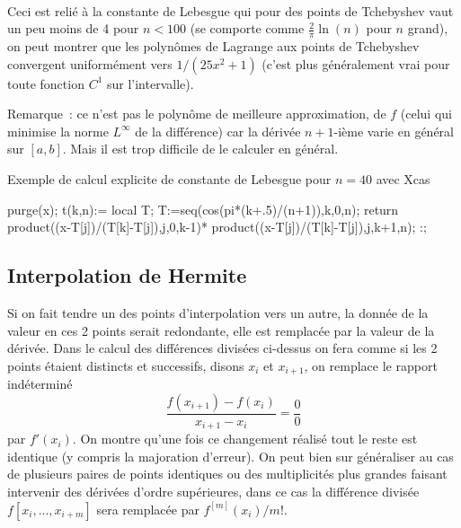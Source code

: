 \documentclass[a4paper,11pt]{article}
\begin{document}
\begin{giacjshere}
\\

Ceci est reli\'e \`a la constante de Lebesgue 
qui pour des points de Tchebyshev vaut un peu moins de 4 pour $n<100$
(se comporte comme $\frac2\pi \ln(n)$ pour $n$ grand), on peut montrer
que les polyn\^omes de Lagrange aux points de Tchebyshev convergent
uniform\'ement vers $1/(25x^2+1)$ (c'est plus g\'en\'eralement
vrai pour toute fonction $C^1$ sur l'intervalle).

Remarque~: ce n'est pas le polyn\^ome de meilleure approximation,
de $f$ (celui qui minimise la norme $L^\infty$ de la diff\'erence)
car la d\'eriv\'ee $n+1$-i\`eme varie en g\'en\'eral sur $[a,b]$. Mais
il est trop difficile de le calculer en g\'en\'eral.

Exemple de calcul explicite de constante de Lebesgue pour $n=40$ avec
Xcas
\begin{giacprog}
purge(x);
t(k,n):={ 
 local T; 
 T:=seq(cos(pi*(k+.5)/(n+1)),k,0,n);
 return product((x-T[j])/(T[k]-T[j]),j,0,k-1)*
  product((x-T[j])/(T[k]-T[j]),j,k+1,n);
}:;
\end{giacprog}

\subsection{Interpolation de Hermite}
Si on fait tendre un des points d'interpolation vers un autre, la
donn\'ee de la valeur en ces 2 points serait redondante, elle 
est remplac\'ee par la valeur de la d\'eriv\'ee. Dans le calcul
des diff\'erences divis\'ees ci-dessus on fera comme si les
2 points \'etaient distincts et successifs, disons $x_i$ et $x_{i+1}$,
on remplace le rapport ind\'etermin\'e 
\[ \frac{f(x_{i+1})-f(x_i)}{x_{i+1}-x_i} = \frac00\]
par $f'(x_i)$.
On montre qu'une fois ce changement r\'ealis\'e
tout le reste est identique (y compris la majoration d'erreur).
On peut bien sur g\'en\'eraliser au cas de plusieurs paires de points 
identiques ou des multiplicit\'es plus grandes faisant intervenir
des d\'eriv\'ees d'ordre sup\'erieures, dans ce cas la diff\'erence
divis\'ee $f[x_i,...,x_{i+m}]$ sera remplac\'ee par $f^{[m]}(x_i)/m!$.


\end{giacjshere}
\end{document}
